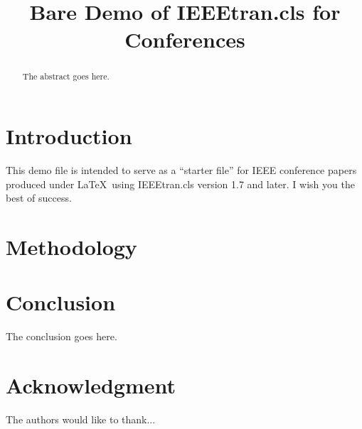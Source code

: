 \documentclass[conference,compsoc]{IEEEtran}
\begin{document}
%
\title{Bare Demo of IEEEtran.cls for Conferences}

\author{
}

\maketitle


\begin{abstract}
The abstract goes here.
\end{abstract}

\section{Introduction}
This demo file is intended to serve as a ``starter file''
for IEEE conference papers produced under \LaTeX\ using
IEEEtran.cls version 1.7 and later.
I wish you the best of success.

\section{Methodology}
\label{sec:methodology}


\section{Conclusion}
The conclusion goes here.

\section*{Acknowledgment}
The authors would like to thank...


\end{document}
